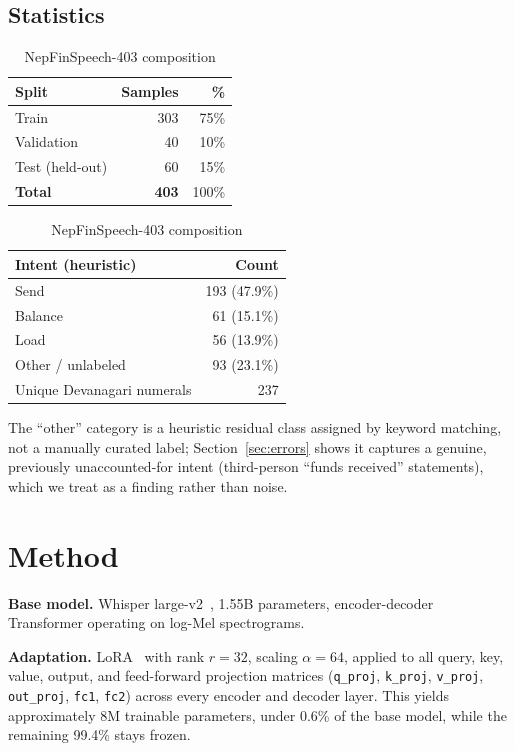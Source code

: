 \documentclass[11pt,a4paper]{article}
\begin{document}
\subsection{Statistics}

\begin{table}[H]
\centering
\caption{NepFinSpeech-403 composition}
\label{tab:dataset}
\begin{tabular}{lrr}
\toprule
\textbf{Split} & \textbf{Samples} & \textbf{\%} \\
\midrule
Train & 303 & 75\% \\
Validation & 40 & 10\% \\
Test (held-out) & 60 & 15\% \\
\midrule
\textbf{Total} & \textbf{403} & 100\% \\
\bottomrule
\end{tabular}
\quad
\begin{tabular}{lr}
\toprule
\textbf{Intent (heuristic)} & \textbf{Count} \\
\midrule
Send & 193 (47.9\%) \\
Balance & 61 (15.1\%) \\
Load & 56 (13.9\%) \\
Other / unlabeled & 93 (23.1\%) \\
\midrule
Unique Devanagari numerals & 237 \\
\bottomrule
\end{tabular}
\end{table}

The ``other'' category is a heuristic residual class assigned by keyword
matching, not a manually curated label; Section~\ref{sec:errors} shows it captures a
genuine, previously unaccounted-for intent (third-person ``funds received''
statements), which we treat as a finding rather than noise.

\section{Method}

\textbf{Base model.} Whisper large-v2~\cite{radford2022}, 1.55B parameters,
encoder-decoder Transformer operating on log-Mel spectrograms.

\textbf{Adaptation.} LoRA~\cite{hu2022lora} with rank $r=32$, scaling
$\alpha=64$, applied to all query, key, value, output, and feed-forward
projection matrices (\texttt{q\_proj}, \texttt{k\_proj}, \texttt{v\_proj},
\texttt{out\_proj}, \texttt{fc1}, \texttt{fc2}) across every encoder and
decoder layer. This yields approximately 8M trainable parameters, under
0.6\% of the base model, while the remaining 99.4\% stays frozen.
\end{document}
